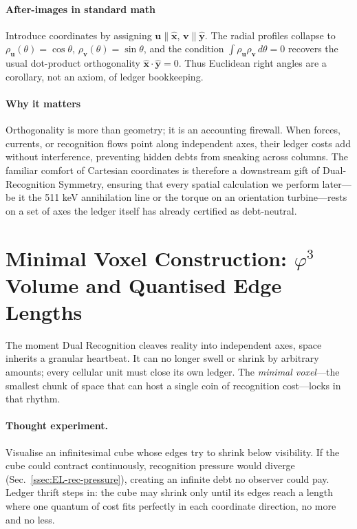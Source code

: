 \documentclass[11pt,oneside]{book}
\begin{document}
\paragraph*{After-images in standard math}

Introduce coordinates by assigning
\(\mathbf u\!\parallel\!\hat{\mathbf x}\),
\(\mathbf v\!\parallel\!\hat{\mathbf y}\).
The radial profiles collapse to
\(\rho_{\mathbf u}(\theta)=\cos\theta\),
\(\rho_{\mathbf v}(\theta)=\sin\theta\),
and the condition
\(\int\rho_{\mathbf u}\rho_{\mathbf v}\,d\theta=0\)
recovers the usual dot-product orthogonality
\(\hat{\mathbf x}\!\cdot\!\hat{\mathbf y}=0\).
Thus Euclidean right angles are a corollary, not an axiom, of
ledger bookkeeping.

\paragraph*{Why it matters}

Orthogonality is more than geometry; it is an accounting firewall.
When forces, currents, or recognition flows point along independent
axes, their ledger costs add without interference, preventing hidden
debts from sneaking across columns.  The familiar comfort of Cartesian
coordinates is therefore a downstream gift of Dual-Recognition Symmetry,
ensuring that every spatial calculation we perform later—be it the
511 keV annihilation line or the torque on an orientation turbine—rests
on a set of axes the ledger itself has already certified as debt-neutral.


\section{Minimal Voxel Construction: \texorpdfstring{$\varphi^{3}$}{ϕ³} Volume and Quantised Edge Lengths}
\label{sec:min-voxel}

The moment Dual Recognition cleaves reality into independent axes, space inherits a granular heartbeat.  
It can no longer swell or shrink by arbitrary amounts; every cellular unit must close its own ledger.  
The \emph{minimal voxel}—the smallest chunk of space that can host a single coin of recognition cost—locks in that rhythm.

\paragraph*{Thought experiment.}
Visualise an infinitesimal cube whose edges try to shrink below visibility.  
If the cube could contract continuously, recognition pressure would diverge (Sec.~\ref{ssec:EL-rec-pressure}), creating an infinite debt no observer could pay.  
Ledger thrift steps in: the cube may shrink only until its edges reach a length where one quantum of cost fits perfectly in each coordinate direction, no more and no less.
\end{document}
